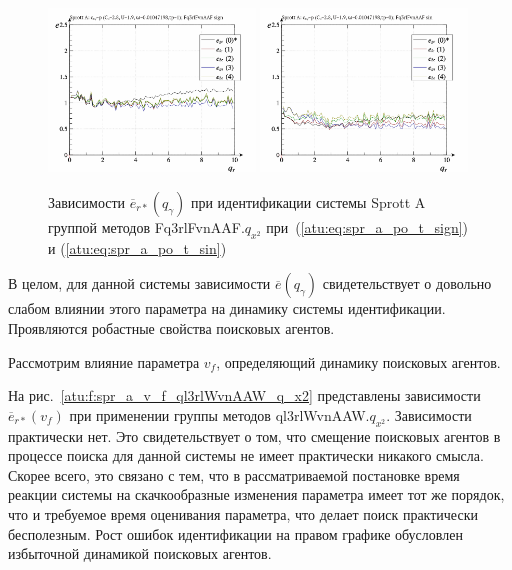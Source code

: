 \begin{figure}[htb!]
  \centerline{
    \includegraphics[width=0.49\textwidth]{p/cha/spr_a/Fq3rlFvnAAF_x2/sprott_a_id-p_q_gamma_sign.png}
    \hfill
    \includegraphics[width=0.49\textwidth]{p/cha/spr_a/Fq3rlFvnAAF_x2/sprott_a_id-p_q_gamma_sin.png}
  }
  \caption{Зависимости $\overline{e}_{r*}(q_\gamma)$ при идентификации системы Sprott A группой методов Fq3rlFvnAAF.$q_{x^2}$
   при~(\ref{atu:eq:spr_a_po_t_sign}) и (\ref{atu:eq:spr_a_po_t_sin})}
  \label{atu:f:spr_a_qg_Fq3rlFvnAAF_q_x2}
\end{figure}

В целом, для данной системы
зависимости $\overline{e}( q_\gamma )$ %
свидетельствует о довольно слабом влиянии этого параметра
на динамику системы идентификации.
Проявляются робастные свойства поисковых агентов.


Рассмотрим влияние
параметра $v_f$, определяющий динамику поисковых агентов.


На рис.~\ref{atu:f:spr_a_v_f_ql3rlWvnAAW_q_x2} представлены зависимости
$\overline{e}_{r*}(v_f)$ при применении группы методов ql3rlWvnAAW.$q_{x^2}$.
Зависимости практически нет. Это свидетельствует о том,
что смещение поисковых агентов в процессе поиска
для данной системы не имеет практически никакого смысла.
Скорее всего, это связано с тем, что в рассматриваемой постановке
время реакции системы на скачкообразные изменения параметра
имеет тот же порядок, что и требуемое время оценивания параметра,
что делает поиск практически бесполезным.
Рост ошибок идентификации на правом графике обусловлен
избыточной динамикой поисковых агентов.



